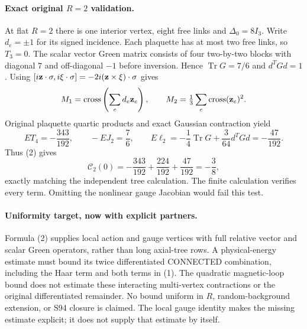 \documentclass[11pt]{article}
\begin{document}
\paragraph{Exact original $R=2$ validation.}
At flat $R=2$ there is one interior vertex, eight free links and
$\Delta_0=8I_3$. Write $d_e=\pm1$ for its signed incidence.
Each plaquette has at most two free links, so $T_3=0$.
The scalar vector Green matrix consists of four two-by-two blocks
with diagonal $7$ and off-diagonal $-1$ before inversion. Hence
$\operatorname{Tr}G=7/6$ and $d^TGd=1$.
Using $[i{\bf z}\cdot\sigma,i{\bf \xi}\cdot\sigma]
=-2i({\bf z}\times{\bf \xi})\cdot\sigma$ gives
\[
 M_1=\operatorname{cross}\left(\sum_e d_e{\bf z}_e\right),\qquad
 M_2=\tfrac13\sum_e\operatorname{cross}({\bf z}_e)^2.
\]
Original plaquette quartic products and exact Gaussian contraction yield
\[
 ET_4=-\frac{343}{192},\qquad -EJ_2=\frac76,\qquad
 E\ell_2=-\frac14\operatorname{Tr}G+\frac3{64}d^TGd
                  =-\frac{47}{192}.
\]
Thus (2) gives
\[
 \mathcal C_2(0)=-\frac{343}{192}+\frac{224}{192}
                         +\frac{47}{192}=-\frac38,
\]
exactly matching the independent tree calculation. The finite calculation verifies every term.
Omitting the nonlinear gauge Jacobian would fail this test.

\paragraph{Uniformity target, now with explicit partners.}
Formula (2) supplies local action and gauge vertices with full relative
vector and scalar Green operators, rather than long axial-tree rows.
A physical-energy estimate must bound its twice differentiated CONNECTED
combination, including the Haar term and both terms in (1).
The quadratic magnetic-loop bound does not estimate these interacting
multi-vertex contractions or the original differentiated remainder.
No bound uniform in $R$, random-background extension, or S94 closure is
claimed. The local gauge identity makes the missing estimate explicit;
it does not supply that estimate by itself.
\end{document}
